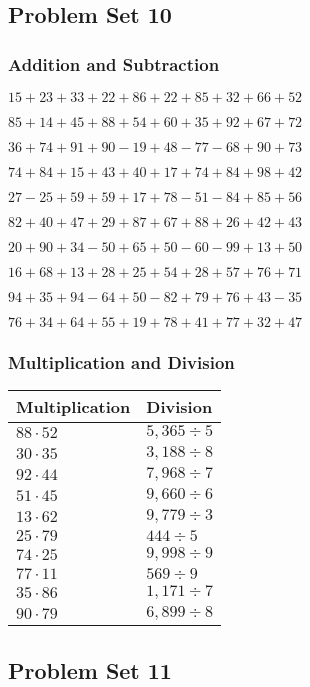\hypertarget{problem-set-10-1}{%
\subsection{Problem Set 10}\label{problem-set-10-1}}

\hypertarget{addition-and-subtraction-50}{%
\subsubsection{Addition and
Subtraction}\label{addition-and-subtraction-50}}

\(15+23+33+22+86+22+85+32+66+ 52\)

\(85+14+45+88+54+60+35+92+67+72\)

\(36+74+91+90-19+48-77-68+90+73\)

\(74+84+15+43+40+17+74+84+98+42\)

\(27-25+59+59+17+78-51-84+85+56\)

\(82+40+47+29+87+67+88+26+42+43\)

\(20+90+34-50+65+50-60-99+13+50\)

\(16+68+13+28+25+54+28+57+76+71\)

\(94+35+94-64+50-82+79+76+43-35\)

\(76+34+64+55+19+78+41+77+32+47\)

\hypertarget{multiplication-and-division-50}{%
\subsubsection{Multiplication and
Division}\label{multiplication-and-division-50}}

\begin{longtable}[]{@{}ll@{}}
\toprule
Multiplication & Division\tabularnewline
\midrule
\endhead
\(88\cdot52\) & \(5,365÷5\)\tabularnewline
\(30\cdot35\) & \(3,188÷8\)\tabularnewline
\(92\cdot44\) & \(7,968÷7\)\tabularnewline
\(51\cdot45\) & \(9,660÷6\)\tabularnewline
\(13\cdot62\) & \(9,779÷3\)\tabularnewline
\(25\cdot79\) & \(444÷5\)\tabularnewline
\(74\cdot25\) & \(9,998÷9\)\tabularnewline
\(77\cdot11\) & \(569÷9\)\tabularnewline
\(35\cdot86\) & \(1,171÷7\)\tabularnewline
\(90\cdot79\) & \(6,899÷8\)\tabularnewline
\bottomrule
\end{longtable}

\hypertarget{problem-set-11-1}{%
\subsection{Problem Set 11}\label{problem-set-11-1}}

